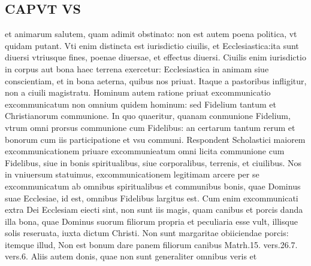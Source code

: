 \documentclass{article}
\begin{document}
\begin{pages}
\section*{CAPVT  VS }
\marginpar{[ p.401 ]}\pstart et animarum salutem, quam adimit obstinato: non est autem poena politica, vt quidam putant. Vti enim distincta est iurisdictio ciuilis, et Ecclesiastica:ita sunt diuersi vtriusque fines, poenae diuersae, et effectus diuersi. Ciuilis enim iurisdictio in corpus aut bona haec terrena exercetur: Ecclesiastica in animam siue conscientiam, et in bona aeterna, quibus nos priuat. Itaque a pastoribus infligitur, non a ciuili magistratu. Hominum autem ratione priuat excommunicatio excommunicatum non omnium quidem hominum: sed Fidelium tantum et Christianorum communione. In quo quaeritur, quanam conmunione Fidelium, vtrum omni prorsus communione cum Fidelibus: an certarum tantum rerum et bonorum cum iis participatione et vsu communi. Respondent Scholastici maiorem excommunicationem priuare excommunieatum omni licita communione cum Fidelibus, siue in bonis spiritualibus, siue corporalibus, terrenis, et ciuilibus. Nos in vniuersum statuimus, excommunicationem legitimam arcere per se excommunicatum ab omnibus spiritualibus et communibus bonis, quae Dominus suae Ecclesiae, id est, omnibus Fidelibus largitus est. Cum enim excommunicati extra Dei Ecclesiam eiecti sint, non sunt iis magis, quam canibus et porcis danda illa bona, quae Dominus suorum filiorum propria et peculiaria esse vult, illisque solis reseruata, iuxta dictum Christi. Non sunt margaritae obiiciendae porcis: itemque illud, Non est bonum dare panem filiorum canibus Matrh.15. vers.26.7. vers.6. Aliis autem donis, quae non sunt generaliter omnibus veris et  \pend

\end{pages}
\end{document}
